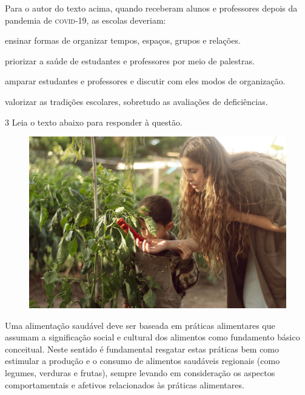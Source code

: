Para o autor do texto acima, quando receberam alunos e professores depois da pandemia de 
\textsc{covid}-19, as escolas deveriam: 

\begin{escolha}

  \item ensinar formas de organizar tempos, espaços, grupos e relações.

  \item priorizar a saúde de estudantes e professores por meio de palestras.

  \item amparar estudantes e professores e discutir com eles modos de organização.

  \item valorizar as tradições escolares, sobretudo as avaliações de deficiências.  

\end{escolha}

\num{3} Leia o texto abaixo para responder à questão.

\begin{myquote}

\begin{figure}[H]
\centering
\includegraphics[scale=0.35]{./imgSAEB_7_POR/media/image28.png}
\end{figure}

Uma alimentação saudável deve ser baseada em práticas alimentares que
assumam a significação social e cultural dos alimentos como fundamento
básico conceitual. Neste sentido é fundamental resgatar estas práticas
bem como estimular a produção e o consumo de alimentos saudáveis
regionais (como legumes, verduras e frutas), sempre levando em
consideração os aspectos comportamentais e afetivos relacionados às
práticas alimentares.


\end{myquote}


